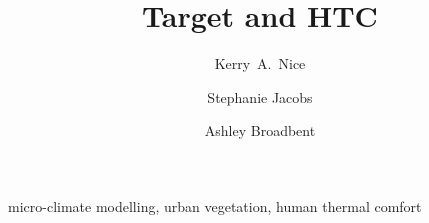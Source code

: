 \documentclass[final,3p,times,authoryear]{elsarticle}
\begin{document}
 


\begin{frontmatter}



\title{Target and HTC}




\author[melb]{Kerry~A.~Nice}
\author[monash,crc]{Stephanie Jacobs}
\author[az1,az2,monash,crc]{Ashley Broadbent}



\address[melb]{Transport, Health, and Urban Design Hub, Faculty of Architecture, Building, and Planning, University of Melbourne, Victoria 3010, Australia}
\address[monash]{School of Earth, Atmosphere and Environment, Monash University, Clayton, VIC 3800, Australia}
\address[az1]{School of Geographical Sciences and Urban Planning, Arizona State University, Tempe, Arizona, USA}
\address[az2]{Urban Climate Research Center, Arizona State University, Tempe, Arizona, USA}
\address[crc]{Cooperative Research Centre for Water Sensitive Cities, Melbourne, Australia}





\begin{abstract}



\end{abstract}

\begin{keyword}
micro-climate modelling, urban vegetation, human thermal comfort



\end{keyword}

\end{frontmatter}
\end{document}
